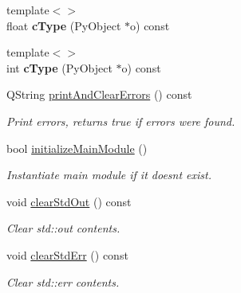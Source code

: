 \begin{Indent}
\begin{DoxyCompactItemize}
\item 
\mbox{\label{classrev_1_1_python_a_p_i_a50ea09feeab94a9eb4849fdb0652d12b}} 
{\footnotesize template$<$$>$ }\\float {\bfseries c\+Type} (Py\+Object $\ast$o) const
\item 
\mbox{\label{classrev_1_1_python_a_p_i_a101ee1dd7691666679565f6a2e90f6d1}} 
{\footnotesize template$<$$>$ }\\int {\bfseries c\+Type} (Py\+Object $\ast$o) const
\item 
\mbox{\label{classrev_1_1_python_a_p_i_ad442ed1f865c4fb79c700e58b106d467}} 
Q\+String \mbox{\hyperlink{classrev_1_1_python_a_p_i_ad442ed1f865c4fb79c700e58b106d467}{print\+And\+Clear\+Errors}} () const
\begin{DoxyCompactList}\small\item\em Print errors, returns true if errors were found. \end{DoxyCompactList}\item 
bool \mbox{\hyperlink{classrev_1_1_python_a_p_i_ac2e3121630ff3d6cd2df2957958d25e2}{initialize\+Main\+Module}} ()
\begin{DoxyCompactList}\small\item\em Instantiate main module if it doesn\textquotesingle{}t exist. \end{DoxyCompactList}\item 
\mbox{\label{classrev_1_1_python_a_p_i_a32b760839b50a394e012bf81f3fd5dde}} 
void \mbox{\hyperlink{classrev_1_1_python_a_p_i_a32b760839b50a394e012bf81f3fd5dde}{clear\+Std\+Out}} () const
\begin{DoxyCompactList}\small\item\em Clear std\+::out contents. \end{DoxyCompactList}\item 
\mbox{\label{classrev_1_1_python_a_p_i_ac6c9faa1932ba70ed1dbd48005660a73}} 
void \mbox{\hyperlink{classrev_1_1_python_a_p_i_ac6c9faa1932ba70ed1dbd48005660a73}{clear\+Std\+Err}} () const
\begin{DoxyCompactList}\small\item\em Clear std\+::err contents. \end{DoxyCompactList}\end{DoxyCompactItemize}
\end{Indent}

